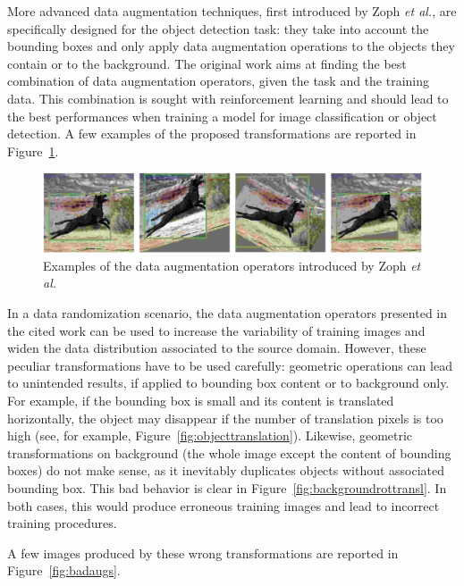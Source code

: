 \documentclass[%
    corpo=12pt,
    twoside,
    stile=classica,   
    tipotesi=magistrale,
    evenboxes,
    english,
	numerazioneromana,
]{toptesi}
\begin{document}
\bigskip
More advanced data augmentation techniques, first introduced by Zoph \textit{et al.}\cite{zoph2019learning}, are specifically designed for the object detection task: they take into account the bounding boxes and only apply data augmentation operations to the objects they contain or to the background. The original work aims at finding the best combination of data augmentation operators, given the task and the training data. This combination is sought with reinforcement learning and should lead to the best performances when training a model for image classification or object detection. A few examples of the proposed transformations are reported in Figure~\ref{fig:learndataaug}.

\begin{figure}[ht!]
	\centering
	\includegraphics[width=0.9\linewidth]{imgs/learndataaug.png}
	\caption{Examples of the data augmentation operators introduced by Zoph \textit{et al.}\cite{zoph2019learning}}
	\label{fig:learndataaug}
\end{figure}

\medskip
In a data randomization scenario, the data augmentation operators presented in the cited work can be used to increase the variability of training images and widen the data distribution associated to the source domain. However, these peculiar transformations have to be used carefully: geometric operations can lead to unintended results, if applied to bounding box content or to background only. For example, if the bounding box is small and its content is translated horizontally, the object may disappear if the number of translation pixels is too high (see, for example, Figure~\ref{fig:objecttranslation}). Likewise, geometric transformations on background (the whole image except the content of bounding boxes) do not make sense, as it inevitably duplicates objects without associated bounding box. This bad behavior is clear in Figure~\ref{fig:backgroundrottransl}. In both cases, this would produce erroneous training images and lead to incorrect training procedures.

A few images produced by these wrong transformations are reported in Figure~\ref{fig:badaugs}.
\end{document}
